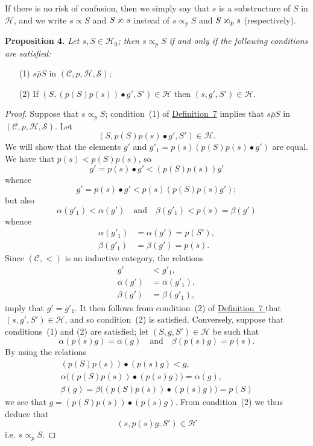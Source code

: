 \documentclass[a4paper,oneside,nobib,nofonts,notitlepage,notoc,nols,fleqn,justified]{tufte-book}
\newenvironment{itenv}[1]
  {\phantomsection\par\medskip\noindent\textbf{#1.}\itshape}
  {\par\medskip}
\newcommand{\oldpage}[1]{{\reversemarginpar\marginnote{\raggedleft\footnotesize\textit{p.~#1}}}}
\newcommand{\CC}{\mathcal{C}}
\newcommand{\HH}{\mathcal{H}}
\renewcommand{\SS}{\mathcal{S}}
\newcommand{\relrhobar}{\mathrel{\bar{\rho}}}
\newcommand{\subs}{\mathrel{\propto}}
\newcommand{\sups}{\mathrel{\reflectbox{$\propto$}}}
\begin{document}
If there is no risk of confusion, then we simply say that $s$ is a substructure of $S$ in $\HH$, and we write $s\subs S$ and $S\sups s$ instead of $s\subs_p S$ and $S\sups_p s$ (respectively).

\begin{itenv}{Proposition 4}
\label{proposition:4}
  Let $s,S\in\HH_0$;
  then $s\subs_p S$ if and only if the following conditions are satisfied:
  \begin{enumerate}
    \item[\normalfont(1\textquotesingle)]
      $s\relrhobar S$ in $(\CC,p,\HH,\SS)$;
    \item[\normalfont(2\textquotesingle)]
      If $(S,(p(S)p(s))\bullet g',S')\in\HH$ then $(s,g',S')\in\HH$.
  \end{enumerate}
\end{itenv}

\begin{proof}
  Suppose that $s\subs_p S$;
  condition~(1) of \hyperref[definition:7]{Definition~7} implies that $s\relrhobar S$ in $(\CC,p,\HH,\SS)$.
  Let
  \[
    (S,p(S)p(s)\bullet g',S')\in\HH.
  \]
  We will show that the elements $g'$ and $g'_1=p(s)(p(S)p(s)\bullet g')$ are equal.
  We have that $p(s)<p(S)p(s)$, so
  \[
    g'
    = p(s)\bullet g'
    < (p(S)p(s))g'
  \]
  whence
  \[
    g'
    = p(s)\bullet g'
    < p(s)(p(S)p(s)g');
  \]
  \oldpage{361}
  but also
  \[
    \alpha(g'_1)<\alpha(g')
    \quad\text{and}\quad
    \beta(g'_1)<p(s)=\beta(g')
  \]
  whence
  \[
    \begin{aligned}
      \alpha(g'_1)
      &= \alpha(g')
      = p(S'),
    \\\beta(g'_1)
      &= \beta(g')
      = p(s).
    \end{aligned}
  \]
  Since $(\CC,<)$ is an inductive category, the relations
  \[
    \begin{aligned}
      g'
      &< g'_1,
    \\\alpha(g')
      &= \alpha(g'_1),
    \\\beta(g')
      &= \beta(g'_1),
    \end{aligned}
  \]
  imply that $g'=g'_1$.
  It then follows from condition~(2) of \hyperref[definition:7]{Definition~7 }that $(s,g',S')\in\HH$, and so condition~(2\textquotesingle) is satisfied.
  Conversely, suppose that conditions~(1\textquotesingle) and (2\textquotesingle) are satisfied;
  let $(S,g,S')\in\HH$ be such that
  \[
    \alpha(p(s)g)=\alpha(g)
    \quad\text{and}\quad
    \beta(p(s)g)=p(s).
  \]
  By using the relations
  \[
    \begin{gathered}
      (p(S)p(s))\bullet(p(s)g)<g,
    \\\alpha\big((p(S)p(s))\bullet(p(s)g)\big)=\alpha(g),
    \\\beta(g)=\beta\big((p(S)p(s))\bullet(p(s)g)\big)=p(S)
    \end{gathered}
  \]
  we see that $g=(p(S)p(s))\bullet(p(s)g)$.
  From condition~(2\textquotesingle) we thus deduce that
  \[
    (s,p(s)g,S')\in\HH
  \]
  i.e. $s\subs_p S$.
\end{proof}
\end{document}
